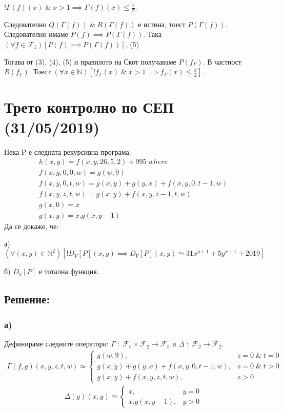 \documentclass{article}
\begin{document}
\(!\Gamma(f)(x) \; \& \; x > 1 \implies \Gamma(f)(x) \leq \displaystyle\frac{x}{2}\).

Следователно \(Q(\Gamma(f)) \; \& \; R(\Gamma(f))\) е истина,
тоест \(P(\Gamma(f))\).
Следователно имаме \(P(f) \implies P(\Gamma(f))\).
Така \((\forall f \in \mathcal{F}_1)[P(f) \implies P(\Gamma(f))]\). (5)

Тогава от (3), (4), (5) и правилото на Скот получаваме \(P(f_\Gamma)\).
В частност \(R(f_\Gamma)\). Тоест \((\forall x \in \mathbb{N})\left[!f_\Gamma(x) \; \& \; x > 1 \implies f_\Gamma(x) \leq \displaystyle\frac{x}{2}\right]\).

\section*{Трето контролно по СЕП (31/05/2019)}
Нека P е следната рекурсивна програма:
\begin{align*}
h(x, y) = f(x, y, 26, 5, 2) + 995 \; where \\
f(x, y, 0, 0, w) = g(w, 9) \\
f(x, y, 0, t, w) = g(x, y) + g(y, x) + f(x, y, 0, t - 1, w) \\
f(x, y, z, t, w) = g(x, y) + f(x, y, z - 1, t, w) \\
g(x, 0) = x \\
g(x, y) = x.g(x, y - 1)
\end{align*}
Да се докаже, че:

а) \((\forall (x, y) \in \mathbb{N}^2)[!D_V[P](x, y) \implies D_V[P](x, y) \simeq 31x^{y + 1} + 5y^{x + 1} + 2019]\)

б) \(D_V[P]\) е тотална функция.

\subsection*{Решение:}

\subsubsection*{а)}
Дефинираме следните оператори: \(\Gamma \; : \; \mathcal{F}_5 \times \mathcal{F}_2 \to \mathcal{F}_5\) и \(\Delta \; : \; \mathcal{F}_2 \to \mathcal{F}_2\).
\begin{align*}
\Gamma(f, g)(x, y, z, t, w) \simeq \begin{cases}
g(w, 9), & z = 0 \; \& \; t = 0 \\
g(x, y) + g(y, x) + f(x, y, 0, t - 1, w), & z = 0 \; \& \; t > 0 \\
g(x, y) + f(x, y, z, t, w), & z > 0
\end{cases}
\end{align*}
\begin{align*}
\Delta(g)(x, y) \simeq \begin{cases}
x, & y = 0 \\
x.g(x, y - 1), & y > 0
\end{cases}
\end{align*}
\end{document}
